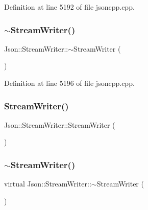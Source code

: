Definition at line 5192 of file jsoncpp.\+cpp.

\hypertarget{class_json_1_1_stream_writer_a03f8fb6a873b6b50f05bc4556e043c3a}{}\label{class_json_1_1_stream_writer_a03f8fb6a873b6b50f05bc4556e043c3a} 
\subsubsection{\texorpdfstring{$\sim$\+Stream\+Writer()}{~StreamWriter()}\hspace{0.1cm}{\footnotesize\ttfamily [1/2]}}
{\footnotesize\ttfamily Json\+::\+Stream\+Writer\+::$\sim$\+Stream\+Writer (\begin{DoxyParamCaption}{ }\end{DoxyParamCaption})\hspace{0.3cm}{\ttfamily [virtual]}}



Definition at line 5196 of file jsoncpp.\+cpp.

\hypertarget{class_json_1_1_stream_writer_a66e6f5113618ce6b04cac9b3c85a3707}{}\label{class_json_1_1_stream_writer_a66e6f5113618ce6b04cac9b3c85a3707} 
\subsubsection{\texorpdfstring{Stream\+Writer()}{StreamWriter()}\hspace{0.1cm}{\footnotesize\ttfamily [2/2]}}
{\footnotesize\ttfamily Json\+::\+Stream\+Writer\+::\+Stream\+Writer (\begin{DoxyParamCaption}{ }\end{DoxyParamCaption})}

\hypertarget{class_json_1_1_stream_writer_af864b265ff4eae8e84307c23f8444799}{}\label{class_json_1_1_stream_writer_af864b265ff4eae8e84307c23f8444799} 
\subsubsection{\texorpdfstring{$\sim$\+Stream\+Writer()}{~StreamWriter()}\hspace{0.1cm}{\footnotesize\ttfamily [2/2]}}
{\footnotesize\ttfamily virtual Json\+::\+Stream\+Writer\+::$\sim$\+Stream\+Writer (\begin{DoxyParamCaption}{ }\end{DoxyParamCaption})\hspace{0.3cm}{\ttfamily [virtual]}}



